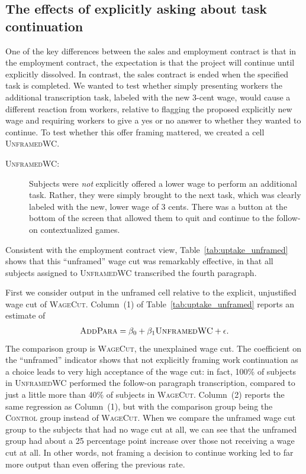\documentclass[11pt]{article}
\begin{document}
\subsection{The effects of explicitly asking about task continuation}
One of the key differences between the sales and employment contract is that in the employment contract, the expectation is that the project will continue until explicitly dissolved.
In contrast, the sales contract is ended when the specified task is completed.
We wanted to test whether simply presenting workers the additional transcription task, labeled with the new 3-cent wage, would cause a different reaction from workers, relative to flagging the proposed explicitly new wage and requiring workers to give a yes or no answer to whether they wanted to continue.
To test whether this offer framing mattered, we created a cell \textsc{UnframedWC}. 

\begin{description} 
\item[\textsc{UnframedWC}:] Subjects were \emph{not} explicitly offered a lower
  wage to perform an additional task. Rather, they were simply brought
  to the next task, which was clearly labeled with the new, lower wage
  of 3 cents.  There was a button at the bottom of the screen that
  allowed them to quit and continue to the follow-on contextualized
  games.
\end{description} 
Consistent with the employment contract view, Table~\ref{tab:uptake_unframed} shows that this ``unframed'' wage cut was remarkably effective, in that all subjects assigned to \textsc{UnframedWC} transcribed the fourth paragraph.  



First we consider output in the unframed cell relative to the explicit, unjustified wage cut of \textsc{WageCut}. 
Column~(1) of Table~\ref{tab:uptake_unframed} reports an estimate of 
\begin{align}
  \textsc{AddPara} = \beta_0 + \beta_{1} \textsc{UnframedWC} + \epsilon.
\end{align}
The comparison group is \textsc{WageCut}, the unexplained wage cut. 
The coefficient on the ``unframed'' indicator shows that not explicitly framing work continuation as a choice leads to very high acceptance of the wage cut:
in fact, 100\% of subjects in \textsc{UnframedWC} performed the follow-on paragraph transcription, compared to just a little more than 40\% of subjects in \textsc{WageCut}.  
Column~(2) reports the same regression as Column~(1), but with the comparison group being the \textsc{Control} group instead of \textsc{WageCut}.
When we compare the unframed wage cut group to the subjects that had no wage cut at all, we can see that the unframed group had about a 25 percentage point increase over those not receiving a wage cut at all. 
In other words, not framing a decision to continue working led to far more output than even offering the previous rate.
\end{document}
